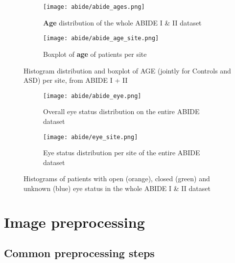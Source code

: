 \documentclass[11pt]{report}
\begin{document}
\begin{figure}
\centering
\begin{subfigure}{0.5\textwidth}
\texttt{[image: abide/abide\_ages.png]}
\caption{\textbf{Age} distribution of the whole ABIDE I \& II dataset}
\label{fig:abideages}
\end{subfigure}

\begin{subfigure}{0.9\textwidth}
\texttt{[image: abide/abide\_age\_site.png]}
\caption{Boxplot of \textbf{age} of patients per site}
\label{fig:abide_age_site}
\end{subfigure}
\caption{Histogram distribution and boxplot of AGE (jointly for Controls and ASD) per site, from ABIDE I + II}
\label{}
\end{figure}





\begin{figure}
\begin{subfigure}{0.4\linewidth}
\texttt{[image: abide/abide\_eye.png]}
\caption{Overall eye status distribution on the entire ABIDE dataset}
\label{fig:abideeye}
\end{subfigure}
\begin{subfigure}{0.7\linewidth}
\texttt{[image: abide/eye\_site.png]}
\caption{Eye status distribution per site of the entire ABIDE dataset}
\label{fig:abideeyesite}
\end{subfigure}
\hspace{0.1 cm}
\caption{Histograms of patients with open (orange), closed (green) and unknown (blue) eye status in the whole ABIDE I \& II dataset}
\label{}
\end{figure}







\chapter{Image preprocessing}\label{chap:image_preprocessing}
\section{Common preprocessing steps}
\label{sec:preprocessing_steps}
\end{document}

